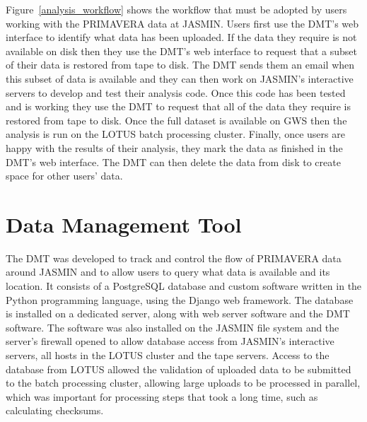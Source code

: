 \documentclass[gmd, manuscript]{copernicus}
\begin{document}
Figure~\ref{analysis_workflow} shows the workflow that must be adopted by users working with the PRIMAVERA data at JASMIN. Users first use the DMT's web interface to identify what data has been uploaded. If the data they require is not available on disk then they use the DMT's web interface to request that a subset of their data is restored from tape to disk. The DMT sends them an email when this subset of data is available and they can then work on JASMIN's interactive servers to develop and test their analysis code. Once this code has been tested and is working they use the DMT to request that all of the data they require is restored from tape to disk. Once the full dataset is available on GWS then the analysis is run on the LOTUS batch processing cluster. Finally, once users are happy with the results of their analysis, they mark the data as finished in the DMT's web interface. The DMT can then delete the data from disk to create space for other users' data.


\section{Data Management Tool}

The DMT was developed to track and control the flow of PRIMAVERA data around JASMIN and to allow users to query what data is available and its location. It consists of a PostgreSQL database and custom software written in the Python programming language, using the Django web framework. The database is installed on a dedicated server, along with web server software and the DMT software. The software was also installed on the JASMIN file system and the server's firewall opened to allow database access from JASMIN's interactive servers, all hosts in the LOTUS cluster and the tape servers. Access to the database from LOTUS allowed the validation of uploaded data to be submitted to the batch processing cluster, allowing large uploads to be processed in parallel, which was important for processing steps that took a long time, such as calculating checksums.
\end{document}
